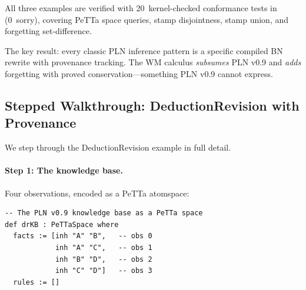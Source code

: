 \documentclass[11pt,openany]{report}
\begin{document}
\noindent
All three examples are verified with 20~kernel-checked conformance
tests in 
(0~sorry), covering PeTTa space queries, stamp disjointness,
stamp union, and forgetting set-difference.

The key result: every classic PLN inference pattern is a specific
compiled BN rewrite with provenance tracking.  The WM calculus
\emph{subsumes} PLN v0.9 and \emph{adds} forgetting with proved
conservation---something PLN v0.9 cannot express.

\subsection{Stepped Walkthrough: DeductionRevision with Provenance}

We step through the DeductionRevision example in full detail.

\paragraph{Step 1: The knowledge base.}
Four observations, encoded as a PeTTa atomspace:

\begin{lstlisting}
-- The PLN v0.9 knowledge base as a PeTTa space
def drKB : PeTTaSpace where
  facts := [inh "A" "B",   -- obs 0
            inh "A" "C",   -- obs 1
            inh "B" "D",   -- obs 2
            inh "C" "D"]   -- obs 3
  rules := []
\end{lstlisting}
\end{document}
